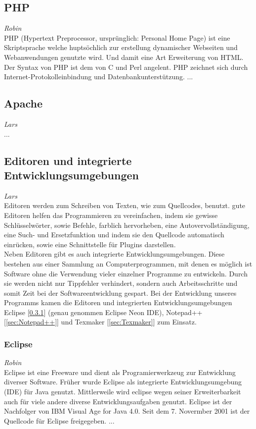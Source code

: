 \documentclass[12pt,a4paper,bibliography=totocnumbered,listof=totocnumbered]{scrartcl}
\begin{document}
\subsection{PHP}
\label{sec:PHP}
\emph{Robin}\\
PHP (Hypertext Preprocessor, ursprünglich: Personal Home Page) ist eine Skriptsprache welche huptsöchlich zur erstellung dynamischer Webseiten und Webanwendungen genutzte wird. Und damit eine Art Erweiterung von HTML. Der Syntax von PHP ist dem von C und Perl angelent. PHP zeichnet sich durch Internet-Protokolleinbindung und Datenbankunterstützung. \cite{PHP}
...

\subsection{Apache}
\label{sec:Apache}
\emph{Lars}\\
...

\subsection{Editoren und integrierte Entwicklungsumgebungen}
\label{sec:Editoren}
\emph{Lars}\\
Editoren werden zum Schreiben von Texten, wie zum Quellcodes, benutzt. gute Editoren helfen das Programmieren zu vereinfachen, indem sie gewisse Schlüsselwörter, sowie Befehle, farblich hervorheben, eine Autovervollständigung, eine Such- und Ersetzfunktion und indem sie den Quellcode automatisch einrücken, sowie eine Schnittstelle für Plugins darstellen.\cite{Texteditor} \\
Neben Editoren gibt es auch integrierte Entwicklungsumgebungen. Diese bestehen aus einer Sammlung an Computerprogrammen, mit denen es möglich ist Software ohne die Verwendung vieler einzelner Programme zu entwickeln. Durch sie werden nicht nur Tippfehler verhindert, sondern auch Arbeitsschritte und somit Zeit bei der Softwareentwicklung gespart.\cite{Integrierte_Entwicklungsumgebung}\cite{Medienbruch}
Bei der Entwicklung unseres Programms kamen die Editoren und integrierten Entwicklungsumgebungen Eclipse [\ref{sec:Eclipse}] (genau genommen Eclipse Neon IDE), Notepad++ [\ref{sec:Notepad++}] und Texmaker [\ref{sec:Texmaker}] zum Einsatz.

\subsubsection{Eclipse}
\label{sec:Eclipse}
\emph{Robin}\\
Eclipse ist eine Freeware und dient als Programierwerkzeug zur Entwicklung diverser Software. Früher wurde Eclipse als integrierte Entwicklungsumgebung (IDE) für Java genutzt. Mittlerweile wird eclipse wegen seiner Erweiterbarkeit auch für viele andere diverse Entwicklungsaufgaben genutzt. Eclipse ist der Nachfolger von IBM Visual Age for Java 4.0. Seit dem 7. Novermber 2001 ist der Quellcode für Eclipse freigegeben. \cite{Eclipse}
...
\end{document}
